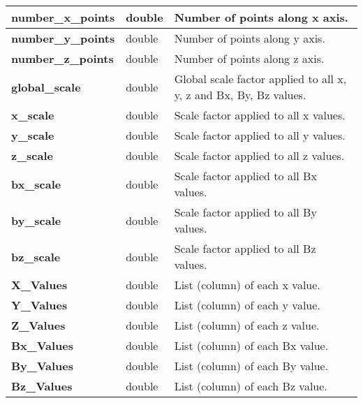 \begin{center}
\tabletail{}
\tablelasttail{}
\begin{supertabular}{|m{3cm}|m{2.305cm}|m{9.5cm}|}
\hline
{\ttfamily\bfseries number\_x\_points} &
double &
Number of points along x axis.\\\hline
{\ttfamily\bfseries number\_y\_points} &
double &
Number of points along y axis.\\\hline
{\ttfamily\bfseries number\_z\_points} &
double &
Number of points along z axis.\\\hline
{\ttfamily\bfseries global\_scale} &
double &
Global scale factor applied to all x, y, z and Bx, By, Bz values.\\\hline
{\ttfamily\bfseries x\_scale} &
double &
Scale factor applied to all x values.\\\hline
{\ttfamily\bfseries y\_scale} &
double &
Scale factor applied to all y values.\\\hline
{\ttfamily\bfseries z\_scale} &
double &
Scale factor applied to all z values.\\\hline
{\ttfamily\bfseries bx\_scale} &
double &
Scale factor applied to all Bx values.\\\hline
{\ttfamily\bfseries by\_scale} &
double &
Scale factor applied to all By values.\\\hline
{\ttfamily\bfseries bz\_scale} &
double &
Scale factor applied to all Bz values.\\\hline
{\ttfamily\bfseries X\_Values} &
double &
List (column) of each x value.\\\hline
{\ttfamily\bfseries Y\_Values} &
double &
List (column) of each y value.\\\hline
{\ttfamily\bfseries Z\_Values} &
double &
List (column) of each z value.\\\hline
{\ttfamily\bfseries Bx\_Values} &
double &
List (column) of each Bx value.\\\hline
{\ttfamily\bfseries By\_Values} &
double &
List (column) of each By value.\\\hline
{\ttfamily\bfseries Bz\_Values} &
double &
List (column) of each Bz value.\\\hline
\end{supertabular}
\end{center}
